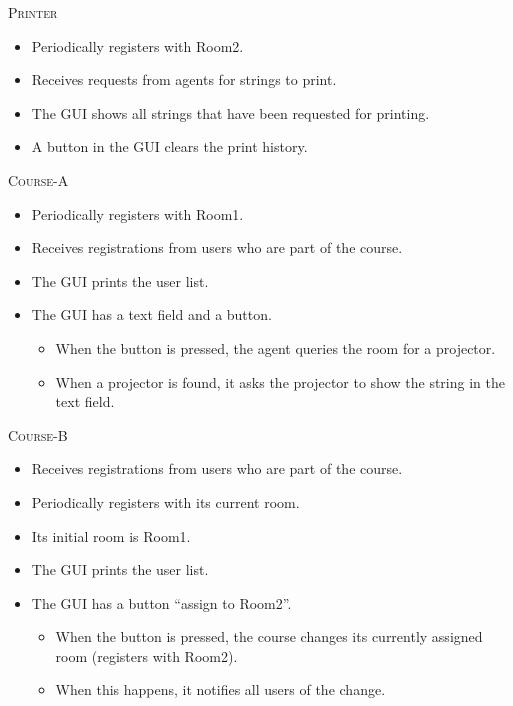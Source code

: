 \documentclass[a4paper, 12pt, twoside]{article}
\begin{document}
\textsc{Printer}
\begin{itemize}
	\item Periodically registers with Room2.
	\item Receives requests from agents for strings to print.
	\item The GUI shows all strings that have been requested for printing.
	\item A button in the GUI clears the print history. 
\end{itemize}


\textsc{Course-A}
\begin{itemize}
	\item Periodically registers with Room1.
	\item Receives registrations from users who are part of the course.
	\item The GUI prints the user list.
	\item The GUI has a text field and a button.
	\begin{itemize}
		\item When the button is pressed, the agent queries the room for a projector.
		\item When a projector is found, it asks the projector to show the string in the text field.
	\end{itemize}
\end{itemize}


\textsc{Course-B}
\begin{itemize}
	\item Receives registrations from users who are part of the course.
	\item Periodically registers with its current room.
	\item Its initial room is Room1.
	\item The GUI prints the user list.
	\item The GUI has a button ``assign to Room2''.
	\begin{itemize}
		\item When the button is pressed, the course changes its currently assigned room (registers with Room2).
		\item When this happens, it notifies all users of the change.
	\end{itemize}
\end{itemize}

\newpage
\end{document}
